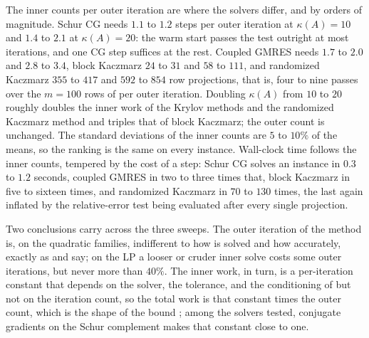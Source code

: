 \documentclass[11pt]{article}
\newcommand{\numericalexperimentsclose}{\end{document}}
\begin{document}
The inner counts per outer iteration are where the solvers differ, and by orders of magnitude.
Schur CG needs $1.1$ to $1.2$ steps per outer iteration at $\kappa(A) = 10$ and $1.4$ to $2.1$ at $\kappa(A) = 20$: the warm start passes the test outright at most iterations, and one CG step suffices at the rest.
Coupled GMRES needs $1.7$ to $2.0$ and $2.8$ to $3.4$, block Kaczmarz $24$ to $31$ and $58$ to $111$, and randomized Kaczmarz $355$ to $417$ and $592$ to $854$ row projections, that is, four to nine passes over the $m = 100$ rows of  per outer iteration.
Doubling $\kappa(A)$ from $10$ to $20$ roughly doubles the inner work of the Krylov methods and the randomized Kaczmarz method and triples that of block Kaczmarz; the outer count is unchanged.
The standard deviations of the inner counts are $5$ to $10\%$ of the means, so the ranking is the same on every instance.
Wall-clock time follows the inner counts, tempered by the cost of a step: Schur CG solves an instance in $0.3$ to $1.2$ seconds, coupled GMRES in two to three times that, block Kaczmarz in five to sixteen times, and randomized Kaczmarz in $70$ to $130$ times, the last again inflated by the relative-error test being evaluated after every single projection.

Two conclusions carry across the three sweeps.
The outer iteration of the method is, on the quadratic families, indifferent to how  is solved and how accurately, exactly as  and  say; on the LP a looser or cruder inner solve costs some outer iterations, but never more than $40\%$.
The inner work, in turn, is a per-iteration constant that depends on the solver, the tolerance, and the conditioning of  but not on the iteration count, so the total work is that constant times the outer count, which is the shape of the bound ; among the solvers tested, conjugate gradients on the Schur complement makes that constant close to one.

\numericalexperimentsclose
\end{document}
